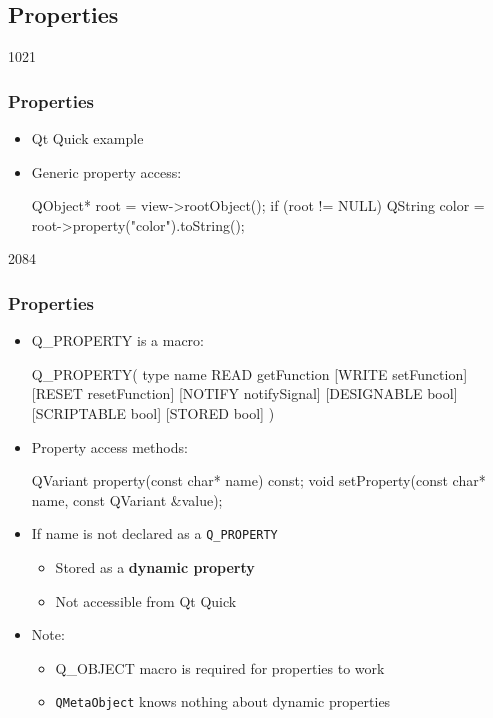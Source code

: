 %
%
%
%

\subsection{Properties}

\begin{slide}[fragile]{1021}
\frametitle{Properties}
\begin{itemize}
\item Qt Quick example\\[2mm]


\item Generic property access:\\
\begin{cpp}
QObject* root = view->rootObject();
if (root != NULL) {
    QString color = root->property("color").toString();
}
\end{cpp}
\end{itemize}
\end{slide}

\begin{slide}[fragile]{2084}
\frametitle{Properties}
\begin{itemize}
  \item Q\_PROPERTY is a macro:
\begin{cpp}
  Q_PROPERTY( type name READ getFunction [WRITE setFunction]
  [RESET resetFunction] [NOTIFY notifySignal] [DESIGNABLE bool]
  [SCRIPTABLE bool] [STORED bool] )
\end{cpp}
  \medskip
  \item Property access methods:
\begin{cpp}
  QVariant property(const char* name) const;
  void setProperty(const char* name, const QVariant &value);
\end{cpp}
  \medskip
  \item If name is not declared as a \texttt{Q\_PROPERTY}
  \begin{itemize}
    \item Stored as a \textbf{dynamic property}
    \item Not accessible from Qt Quick
  \end{itemize}
  \medskip
  \item Note:
  \begin{itemize}
    \item Q\_OBJECT macro is required for properties to work
    \item \texttt{QMetaObject} knows nothing about dynamic properties
  \end{itemize}
\end{itemize}
\end{slide}

